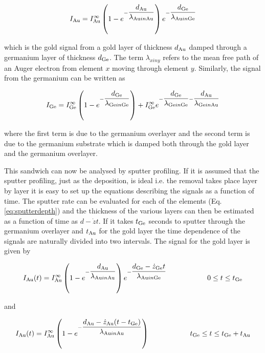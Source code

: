 \begin{equation}
I_{\ce{Au}}=I^{\infty}_{\ce{Au}}\left(1-e^{-\dfrac{d_{\ce{Au}}}{\lambda_{\ce{Au} in \ce{Au}}}}\right)e^{-\dfrac{d_{\ce{Ge}}}{\lambda_{\ce{Au} in \ce{Ge}}}} 
\end{equation}

\noindent which is the gold signal from a gold layer of thickness $d_{\ce{Au}}$ damped through a germanium layer of thickness $d_{\ce{Ge}}$. The term $\lambda_{x in y}$ refers to the mean free path of an Auger electron from element $x$ moving through element $y$. Similarly, the signal from the germanium can be written as

\begin{equation}
I_{\ce{Ge}}=I^{\infty}_{\ce{Ge}}\left(1-e^{-\dfrac{d_{\ce{Ge}}}{\lambda_{\ce{Ge} in \ce{Ge}}}}\right)+ I^{\infty}_{\ce{Ge}}e^{-\dfrac{d_{\ce{Ge}}}{\lambda_{\ce{Ge} in \ce{Ge}}}-\dfrac{d_{\ce{Au}}}{\lambda_{\ce{Ge} in \ce{Au}}}}
\end{equation}

\noindent where the first term is due to the germanium overlayer and the second term is due to the germanium substrate which is damped both through the gold layer and the germanium overlayer.

This sandwich can now be analysed by sputter profiling. If it is assumed that the sputter profiling, just as the deposition, is ideal i.e. the removal takes place layer by layer it is easy to set up the equations describing the signals as a function of time. The sputter rate can be evaluated for each of the elements (Eq. \eqref{eq:sputterdepth}) and the thickness of the various layers can then be estimated as a function of time as $d-\dot{z}t$. If it takes $t_{\ce{Ge}}$ seconds to sputter through the germanium overlayer and $t_{\ce{Au}}$ for the gold layer the time dependence of the signals are naturally divided into two intervals. The signal for the gold layer is given by

\begin{equation}
I_{\ce{Au}}(t)=I^{\infty}_{\ce{Au}}\left(1-e^{-\dfrac{d_{\ce{Au}}}{\lambda_{\ce{Au} in \ce{Au}}}}\right)e^{-\dfrac{d_{\ce{Ge}}-\dot{z}_{\ce{Ge}} t}{\lambda_{\ce{Au} in \ce{Ge}}}} \hspace{2cm} 0\leq t\leq t_{\ce{Ge}}
\end{equation}

\noindent and

\begin{equation}
I_{\ce{Au}}(t)=I^{\infty}_{\ce{Au}}\left(1-e^{-\dfrac{d_{\ce{Au}}-\dot{z}_{\ce{Au}}(t-t_{\ce{Ge}})}{\lambda_{\ce{Au} in \ce{Au}}}}\right) \hspace{2cm} t_{\ce{Ge}}\leq t\leq t_{\ce{Ge}}+t_{\ce{Au}}
\end{equation}

